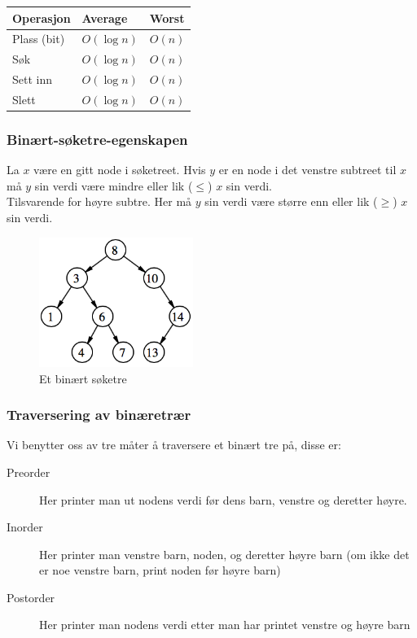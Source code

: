 \documentclass[a4paper, norsk,  10pt]{article}
\begin{document}
{{\begin{center}
\begin{tabular}{|l|l|l|}
    \hline
    Operasjon & Average & Worst \\ \hline
    Plass (bit)     & $O(\log n)$       & $O(n)$     \\ \hline
    Søk    & $O(\log n)$       & $O(n)$     \\ \hline
    Sett inn    & $O(\log n)$       & $O(n)$     \\ \hline
    Slett    & $O(\log n)$       & $O(n)$     \\ \hline
\end{tabular}
\end{center}

\subsubsection{Binært-søketre-egenskapen}

La $x$ være en gitt node i søketreet. Hvis $y$ er en node i det venstre subtreet til $x$ må $y$ sin verdi være mindre eller lik ($\leq$) $x$ sin verdi. \\
\noindent Tilsvarende for høyre subtre. Her må $y$ sin verdi være større enn eller lik ($\geq$) $x$ sin verdi.


\begin{figure}[hbt]
    \begin{center}
        \includegraphics[width=5cm] {binarytree.png}
        \caption{Et binært søketre}
    \end{center}
\end{figure}

\subsubsection{Traversering av binæretrær}

Vi benytter oss av tre måter å traversere et binært tre på, disse er:

\begin{description}
\item[Preorder] Her printer man ut nodens verdi før dens barn, venstre og deretter høyre.
\item[Inorder] Her printer man venstre barn, noden, og deretter høyre barn (om ikke det er noe venstre barn, print noden før høyre barn)
\item[Postorder] Her printer man nodens verdi etter man har printet venstre og høyre barn
\end{description}

}}
\end{document}
